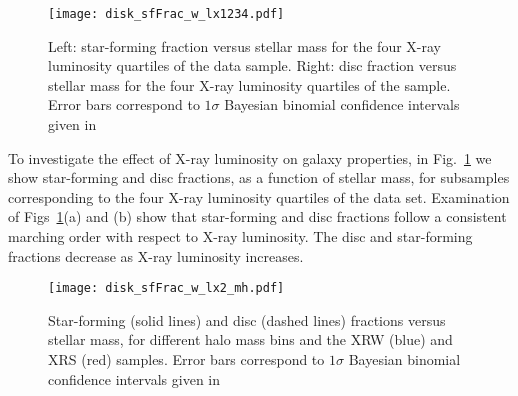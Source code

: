 \begin{figure}[!tp]
  \centering
  \texttt{[image: disk\_sfFrac\_w\_lx1234.pdf]}
  \caption[Star-forming and disc fraction versus stellar mass for
    various X-ray luminosity bins]{Left: star-forming fraction versus stellar mass for the
    four X-ray luminosity quartiles of the data sample.  Right: disc
    fraction versus stellar mass for the four X-ray luminosity
    quartiles of the sample.  Error bars correspond to $1\sigma$
    Bayesian binomial confidence intervals given in \citet{cameron2011}}
  \label{fig:disk_sfFrac_w_lx1234}
\end{figure}

To investigate the effect of X-ray luminosity on galaxy properties, in
Fig.~\ref{fig:disk_sfFrac_w_lx1234} we show star-forming and disc
fractions, as a function of stellar mass, for subsamples corresponding
to the four X-ray luminosity quartiles of the data set.  Examination
of Figs~\ref{fig:disk_sfFrac_w_lx1234}(a) and (b) show that
star-forming and disc fractions follow a consistent marching order
with respect to X-ray luminosity.  The disc and star-forming fractions
decrease as X-ray luminosity increases.

\begin{figure}[!tp]
  \centering
  \texttt{[image: disk\_sfFrac\_w\_lx2\_mh.pdf]}
  \caption[Star-forming and disc fractions versus stellar mass for
    various halo mass bins and the XRS and XRW samples]{Star-forming
    (solid lines) and disc (dashed lines) 
    fractions versus stellar mass, for different halo mass bins and
    the XRW (blue) and XRS (red) samples.  Error bars correspond to
    $1\sigma$ Bayesian binomial confidence intervals given in \citet{cameron2011}}
  \label{fig:disk_sfFrac_w_lx2_mh}
\end{figure}

